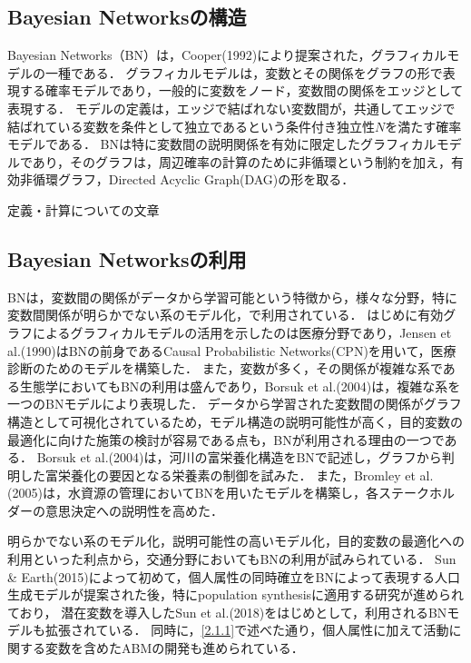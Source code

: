 \subsection{Bayesian Networksの構造}\label{2.2.1}
Bayesian Networks（BN）は，Cooper(1992)\cite{Cooper1992}により提案された，グラフィカルモデルの一種である．
グラフィカルモデルは，変数とその関係をグラフの形で表現する確率モデルであり，一般的に変数をノード，変数間の関係をエッジとして表現する．
モデルの定義は，エッジで結ばれない変数間が，共通してエッジで結ばれている変数を条件として独立であるという条件付き独立性$N$を満たす確率モデルである\cite{Maathuis}．
BNは特に変数間の説明関係を有効に限定したグラフィカルモデルであり，そのグラフは，周辺確率の計算のために非循環という制約を加え，有効非循環グラフ，Directed Acyclic Graph(DAG)の形を取る．

定義・計算についての文章

\subsection{Bayesian Networksの利用}\label{2.2.2}
BNは，変数間の関係がデータから学習可能という特徴から，様々な分野，特に変数間関係が明らかでない系のモデル化，で利用されている．
はじめに有効グラフによるグラフィカルモデルの活用を示したのは医療分野であり，Jensen et al.(1990)\cite{Jensen1990}はBNの前身であるCausal Probabilistic Networks(CPN)を用いて，医療診断のためのモデルを構築した．
また，変数が多く，その関係が複雑な系である生態学においてもBNの利用は盛んであり，Borsuk et al.(2004)\cite{Borsuk2004}は，複雑な系を一つのBNモデルにより表現した．
データから学習された変数間の関係がグラフ構造として可視化されているため，モデル構造の説明可能性が高く，目的変数の最適化に向けた施策の検討が容易である点も，BNが利用される理由の一つである．
Borsuk et al.(2004)\cite{Borsuk2004}は，河川の富栄養化構造をBNで記述し，グラフから判明した富栄養化の要因となる栄養素の制御を試みた．
また，Bromley et al.(2005)\cite{Bromley2005}は，水資源の管理においてBNを用いたモデルを構築し，各ステークホルダーの意思決定への説明性を高めた．

明らかでない系のモデル化，説明可能性の高いモデル化，目的変数の最適化への利用といった利点から，交通分野においてもBNの利用が試みられている．
Sun \& Earth(2015)\cite{Sun2015}によって初めて，個人属性の同時確立をBNによって表現する人口生成モデルが提案された後，特にpopulation synthesisに適用する研究が進められており，
潜在変数を導入したSun et al.(2018)\cite{Sun2018}をはじめとして，利用されるBNモデルも拡張されている．
同時に，\ref{2.1.1}で述べた通り，個人属性に加えて活動に関する変数を含めたABMの開発も進められている．

